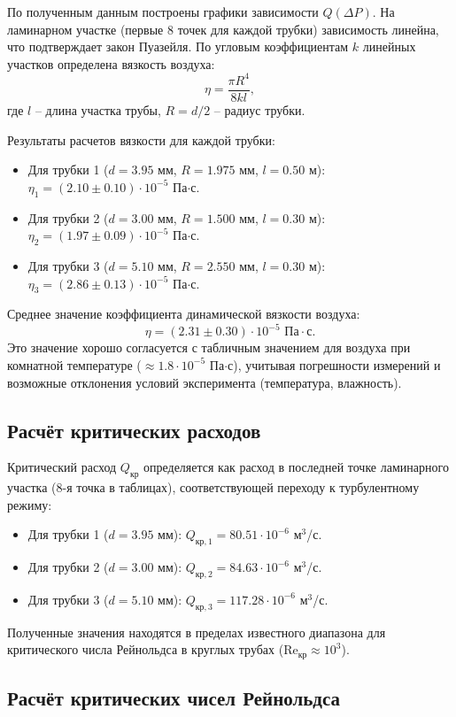 \documentclass[a4paper]{article}
\begin{document}
По полученным данным построены графики зависимости $Q(\Delta P)$. На ламинарном участке (первые 8 точек для каждой трубки) зависимость линейна, что подтверждает закон Пуазейля. По угловым коэффициентам $k$ линейных участков определена вязкость воздуха:
\[
\eta = \frac{\pi R^4}{8kl},
\]
где $l$ -- длина участка трубы, $R = d/2$ -- радиус трубки.

Результаты расчетов вязкости для каждой трубки:
\begin{itemize}
	\item Для трубки 1 ($d=3.95$ мм, $R=1.975$ мм, $l=0.50$ м): $\eta_1 = (2.10 \pm 0.10) \cdot 10^{-5}$ Па$\cdot$с.
	\item Для трубки 2 ($d=3.00$ мм, $R=1.500$ мм, $l=0.30$ м): $\eta_2 = (1.97 \pm 0.09) \cdot 10^{-5}$ Па$\cdot$с.
	\item Для трубки 3 ($d=5.10$ мм, $R=2.550$ мм, $l=0.30$ м): $\eta_3 = (2.86 \pm 0.13) \cdot 10^{-5}$ Па$\cdot$с.
\end{itemize}
Среднее значение коэффициента динамической вязкости воздуха:
\[
\eta = (2.31 \pm 0.30) \cdot 10^{-5} \text{ Па}\cdot\text{с}.
\]
Это значение хорошо согласуется с табличным значением для воздуха при комнатной температуре ($\approx 1.8 \cdot 10^{-5}$ Па$\cdot$с), учитывая погрешности измерений и возможные отклонения условий эксперимента (температура, влажность).

\subsection*{Расчёт критических расходов}
Критический расход $Q_{\text{кр}}$ определяется как расход в последней точке ламинарного участка (8-я точка в таблицах), соответствующей переходу к турбулентному режиму:
\begin{itemize}
	\item Для трубки 1 ($d=3.95$ мм): $Q_{\text{кр},1} = 80.51 \cdot 10^{-6}$ м$^3$/с.
	\item Для трубки 2 ($d=3.00$ мм): $Q_{\text{кр},2} = 84.63 \cdot 10^{-6}$ м$^3$/с.
	\item Для трубки 3 ($d=5.10$ мм): $Q_{\text{кр},3} = 117.28 \cdot 10^{-6}$ м$^3$/с.
\end{itemize}
Полученные значения находятся в пределах известного диапазона для критического числа Рейнольдса в круглых трубах ($\text{Re}_{\text{кр}} \approx 10^3$).
\subsection*{Расчёт критических чисел Рейнольдса}
\end{document}

